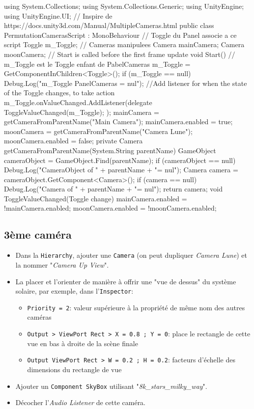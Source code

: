 \documentclass[a4paper,10pt]{article}
\newenvironment{solution}%
{\begin{tcolorbox}[breakable,colback=red!5!white,colframe=red!75!black,title=Solution]}%
{\end{tcolorbox}}
\newenvironment{boxcode}%
{\begin{tcolorbox}[breakable,colback=gray!5!white,colframe=black]}%
	{\end{tcolorbox}}
\begin{document}
\begin{solution}
\begin{boxcode}
	\begin{csharpsansbord}
using System.Collections;
using System.Collections.Generic;
using UnityEngine;
using UnityEngine.UI;
// Inspire de https://docs.unity3d.com/Manual/MultipleCameras.html
public class PermutationCamerasScript : MonoBehaviour
{
	// Toggle du Panel associe a ce script
	Toggle m_Toggle;
	// Cameras manipulees
	Camera mainCamera;
	Camera moonCamera;
	// Start is called before the first frame update
	void Start()
	{
		// m_Toggle est le Toggle enfant de PabelCameras
		m_Toggle = GetComponentInChildren<Toggle>();
		if (m_Toggle == null)
		Debug.Log("m_Toggle PanelCameras = nul");
		//Add listener for when the state of the Toggle changes, to take action
		m_Toggle.onValueChanged.AddListener(delegate {
			ToggleValueChanged(m_Toggle);
		});
		mainCamera = getCameraFromParentName("Main Camera");
		mainCamera.enabled = true;
		moonCamera = getCameraFromParentName("Camera Lune");
		moonCamera.enabled = false;
	}
	private Camera getCameraFromParentName(System.String parentName) {
		GameObject cameraObject = GameObject.Find(parentName);
		if (cameraObject == null)
		Debug.Log("CameraObject of " + parentName + "= nul");
		Camera camera = cameraObject.GetComponent<Camera>();
		if (camera == null)
		Debug.Log("Camera of " + parentName + "= nul");
		return camera;
	}
	void ToggleValueChanged(Toggle change)
	{
		mainCamera.enabled = !mainCamera.enabled;
		moonCamera.enabled = !moonCamera.enabled;
	}
}	
\end{csharpsansbord}
\end{boxcode}
	
	\subsection{3ème caméra}
\begin{itemize}
	\item Dans la \texttt{Hierarchy}, ajouter une \texttt{Camera} (on peut dupliquer \textit{Camera Lune}) et la nommer "\textit{Camera Up View}".
	\item La placer et l'orienter de manière à offrir une "vue de dessus" du système solaire, par exemple, dans l'\texttt{Inspector}:
	\begin{itemize}
		\item \texttt{Priority = 2}: valeur supérieure à la propriété de même nom des autres caméras 
		\item \texttt{Output > ViewPort Rect > X = 0.8 ; Y = 0}: place le rectangle de cette vue en bas à droite de la scène finale
		\item \texttt{Output ViewPort Rect > W = 0.2 ; H = 0.2}: facteurs d'échelle des dimensions du rectangle de vue
	\end{itemize}
	\item Ajouter un \texttt{Component SkyBox} utilisant "\textit{8k\_stars\_milky\_way}".
	\item Décocher l'\textit{Audio Listener} de cette caméra.
\end{itemize}	
\end{solution}
\end{document}
